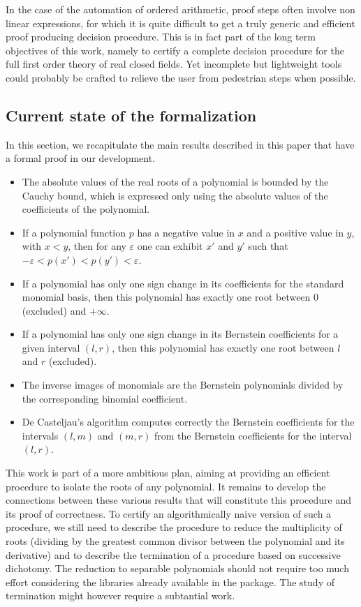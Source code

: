 \documentclass{mscs}
\begin{document}
In the case of the automation of ordered arithmetic, proof steps
often involve non linear expressions, for which it is quite difficult
to get a truly generic and efficient proof producing decision
procedure. This is in fact part of the long term objectives of this
work, namely to
certify a complete decision procedure for the full first order theory
of real closed fields. Yet incomplete but lightweight tools could
probably be crafted to relieve the user from pedestrian steps when
possible.


\subsection{Current state of the formalization}
In this section, we recapitulate the main results described in this paper
that have a formal proof in our development.
\begin{itemize}
\item The absolute values of the real roots of a polynomial is bounded
  by the Cauchy bound, which is expressed only using the absolute
  values of the coefficients of the polynomial.
\item If a polynomial function \(p\)
has a negative value in \(x\) and a positive
value in \(y\), with \(x < y\), then for any \(\varepsilon\) one can
exhibit \(x'\) and \(y'\) such that \(-\varepsilon < p(x') < p(y') < \varepsilon\).
\item If a polynomial has only one sign change in its coefficients for the
standard monomial basis, then this polynomial has exactly one root between
\(0\) (excluded) and \(+\infty\).
\item If a polynomial has only one sign change in its Bernstein coefficients
for a given interval \((l,r)\), then this polynomial has exactly one root
between \(l\) and \(r\) (excluded).
\item The inverse images of monomials are the Bernstein polynomials divided
by the corresponding binomial coefficient.
\item De Casteljau's algorithm computes correctly the Bernstein coefficients
for the intervals \((l,m)\) and \((m,r)\) from the Bernstein coefficients
for the interval \((l,r)\).
\end{itemize}
This work is part of a more ambitious plan, aiming at providing an
efficient procedure
to isolate the roots of any polynomial.  It remains to develop the connections
between these various results that will constitute this procedure and its proof
of correctness. To certify an algorithmically naive version of such a
procedure, we still need to describe the procedure to reduce the
multiplicity of roots (dividing by the greatest common divisor
between the polynomial and its derivative) and to describe the termination
of a procedure based on successive dichotomy. The reduction to separable
polynomials should not require too much effort considering the
libraries already available in the \ssr{} package. The study of
termination might however require a subtantial work.
\end{document}

